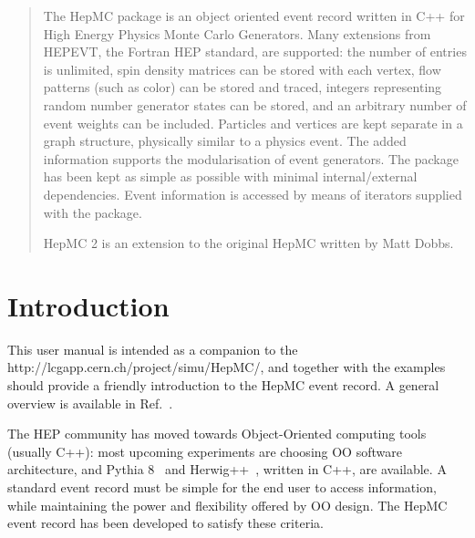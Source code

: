 \documentclass[11pt,letterpaper]{article}
\begin{document}
\begin{titlepage}
\begin{center}
\end{center}
\begin{abstract}
  The HepMC package is an object oriented event record written in C++
  for High Energy Physics Monte Carlo Generators.  Many extensions
  from HEPEVT, the Fortran HEP standard, are supported: the number of
  entries is unlimited, spin density matrices can be stored with each
  vertex, flow patterns (such as color) can be stored and traced,
  integers representing random number generator states can be stored,
  and an arbitrary number of event weights can be included.  Particles
  and vertices are kept separate in a graph structure, physically
  similar to a physics event.  The added information supports the
  modularisation of event generators.  The package has been kept as
  simple as possible with minimal internal/external dependencies.
  Event information is accessed by means of iterators supplied with
  the package. 

  HepMC 2 is an extension to the original HepMC written by Matt Dobbs.
\end{abstract}
\end{titlepage}

\setcounter{page}{1}
\tableofcontents

\newpage

%
%

\section{Introduction}
This user manual is intended as a companion to the 
{http://lcgapp.cern.ch/project/simu/HepMC/},
and together with the examples
should provide a friendly introduction to the HepMC event record. A
general overview is available in Ref.~\cite{dobbs:2000CompPhysComm}.

The HEP community has moved towards Object-Oriented computing tools
(usually C++): most upcoming experiments are choosing OO software
architecture, and Pythia 8~\cite{Torbjorn} and 
Herwig++~\cite{Richardson}, written in C++, are available.  
A standard event record must be simple for the end user to access information,
while maintaining the power and flexibility offered by OO design. The
HepMC event record has been developed to satisfy these criteria.
\end{document}
